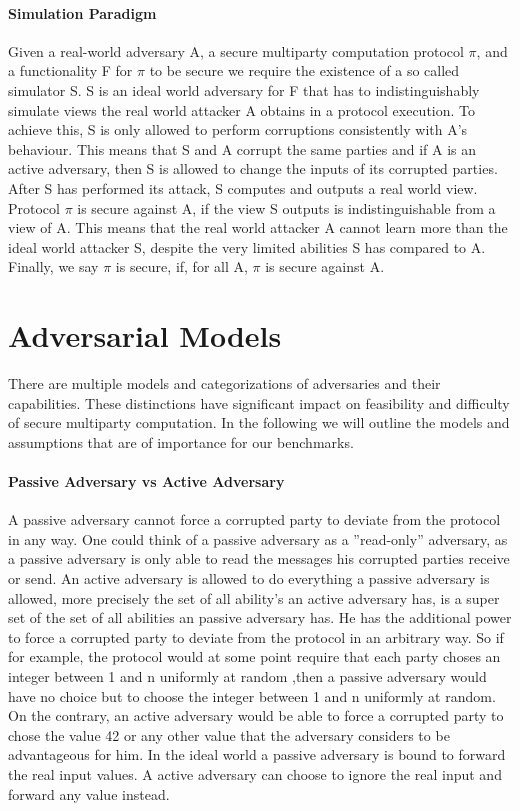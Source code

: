 \paragraph{Simulation Paradigm}
Given a real-world adversary A, a secure multiparty computation protocol $\pi $, and a functionality F for $\pi $ to be secure we require the existence of a so called simulator S.
S is an ideal world adversary for F that has to indistinguishably simulate views the real world attacker A obtains in a protocol execution. To achieve this, S is only allowed to perform corruptions consistently with A's behaviour. This means that S and A corrupt the same parties and if A is an active adversary, then S is allowed to change the inputs of its corrupted parties. After S has performed its attack, S computes and  outputs a real world view. Protocol $\pi $ is secure against A, if the view S outputs is indistinguishable from a view of A. This means that the real world attacker A cannot learn more than the ideal world attacker S, despite the very limited abilities S has compared to A. Finally, we say $\pi $ is secure, if, for all A, $\pi $ is secure against A. 

\section{Adversarial Models}
\label{sec:Adversarial Models}
There are multiple models and categorizations of adversaries and their capabilities. These distinctions have significant impact on feasibility and difficulty of secure multiparty computation. In the following we will outline the models and assumptions that are of importance for our benchmarks. 

\paragraph{Passive Adversary vs Active Adversary}
A passive adversary cannot force a corrupted party to deviate from the protocol in any way. One could think of a passive adversary as a ''read-only'' adversary, as a passive adversary is only able to read the messages his corrupted parties receive or send. An active adversary is allowed to do everything a passive adversary is allowed, more precisely the set of all ability's an active adversary has, is a super set of the set of all abilities an passive adversary has. He has the additional power to force a corrupted party to deviate from the protocol in an arbitrary way. So if for example, the protocol would at some point require that each party choses an integer between 1 and n uniformly at random ,then a passive adversary would have no choice but to choose the integer between 1 and n uniformly at random. 
On the contrary, an active adversary would be able to force a corrupted party to chose the value 42 or any other value that the adversary considers to be advantageous for him. In the ideal world a passive adversary is bound to forward the real input values. A active adversary can choose to ignore the real input and forward any value instead. 

